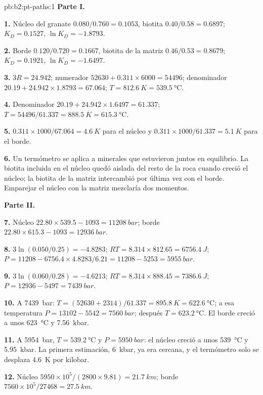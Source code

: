 \begin{solution}{pb:b2:pt-paths:1}
\noindent\textbf{Parte I.}

\textbf{1.} Núcleo del granate $0.080/0.760 = 0.1053$, biotita $0.40/0.58 = 0.6897$; $K_D =
0.1527$, $\ln K_D = -1.8793$.

\textbf{2.} Borde $0.120/0.720 = 0.1667$, biotita de la matriz $0.46/0.53 = 0.8679$; $K_D =
0.1921$, $\ln K_D = -1.6497$.

\textbf{3.} $3R = 24.942$; numerador $52630 + 0.311\times6000 = 54496$; denominador $20.19
+ 24.942\times1.8793 = 67.064$; $T = \qty{812.6}{K} = \qty{539.5}{\celsius}$.

\textbf{4.} Denominador $20.19 + 24.942\times1.6497 = 61.337$; $T = 54496/61.337 =
\qty{888.5}{K} = \qty{615.3}{\celsius}$.

\textbf{5.} $0.311\times1000/67.064 = \qty{4.6}{K}$ para el núcleo y $0.311\times1000/61.337
= \qty{5.1}{K}$ para el borde.

\textbf{6.} Un termómetro se aplica a minerales que estuvieron juntos en equilibrio. La
biotita incluida en el núcleo quedó aislada del resto de la roca cuando creció el núcleo;
la biotita de la matriz intercambió por última vez con el borde. Emparejar el núcleo con la matriz mezclaría
dos momentos.

\noindent\textbf{Parte II.}

\textbf{7.} Núcleo $22.80\times539.5 - 1093 = \qty{11208}{bar}$; borde $22.80\times615.3 -
1093 = \qty{12936}{bar}$.

\textbf{8.} $3\ln(0.050/0.25) = -4.8283$; $RT = 8.314\times812.65 = \qty{6756.4}{J}$; $P =
11208 - 6756.4\times4.8283/6.21 = 11208 - 5253 = \qty{5955}{bar}$.

\textbf{9.} $3\ln(0.060/0.28) = -4.6213$; $RT = 8.314\times888.45 = \qty{7386.6}{J}$; $P
= 12936 - 5497 = \qty{7439}{bar}$.

\textbf{10.} A \qty{7439}{bar}: $T = (52630 + 2314)/61.337 = \qty{895.8}{K} =
\qty{622.6}{\celsius}$; a esa temperatura $P = 13102 - 5542 = \qty{7560}{bar}$; después $T
= \qty{623.2}{\celsius}$. El borde creció a unos \qty{623}{\celsius} y \qty{7.56}{kbar}.

\textbf{11.} A \qty{5954}{bar}, $T = \qty{539.2}{\celsius}$ y $P = \qty{5950}{bar}$: el
núcleo creció a unos \qty{539}{\celsius} y \qty{5.95}{kbar}. La primera estimación,
\qty{6}{kbar}, ya era cercana, y el termómetro solo se desplaza \qty{4.6}{K} por kilobar.

\textbf{12.} Núcleo $5950\times10^5/(2800\times9.81) = \qty{21.7}{km}$; borde
$7560\times10^5/27468 = \qty{27.5}{km}$.


\end{solution}
